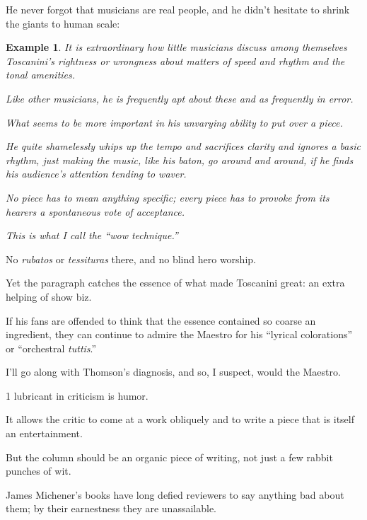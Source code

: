 \documentclass{book}
\numberwithin{equation}{section}
\newtheorem{example}{Example}[chapter]
\begin{document}
He never forgot that musicians are real people, and he didn't hesitate to shrink the giants to human scale:
\begin{example}
    It is extraordinary how little musicians discuss among themselves Toscanini's rightness or wrongness about matters of speed and rhythm and the tonal amenities.
    
    Like other musicians, he is frequently apt about these and as frequently in error.
    
    What seems to be more important in his unvarying ability to put over a piece.
    
    He quite shamelessly whips up the tempo and sacrifices clarity and ignores a basic rhythm, just making the music, like his baton, go around and around, if he finds his audience's attention tending to waver.
    
    No piece has to mean anything specific; every piece has to provoke from its hearers a spontaneous vote of acceptance.
    
    This is what I call the ``wow technique.''
\end{example}
No \textit{rubatos} or \textit{tessituras} there, and no blind hero worship.

Yet the paragraph catches the essence of what made Toscanini great: an extra helping of show biz.

If his fans are offended to think that the essence contained so coarse an ingredient, they can continue to admire the Maestro for his ``lyrical colorations'' or ``orchestral \textit{tuttis}.''

I'll go along with Thomson's diagnosis, and so, I suspect, would the Maestro.

%
1 lubricant in criticism is humor.

It allows the critic to come at a work obliquely and to write a piece that is itself an entertainment.

But the column should be an organic piece of writing, not just a few rabbit punches of wit.

James Michener's books have long defied reviewers to say anything bad about them; by their earnestness they are unassailable.
\end{document}
